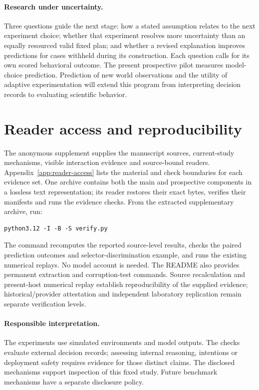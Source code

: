 \paragraph{Research under uncertainty.}
Three questions guide the next stage: how a stated assumption relates to the
next experiment choice; whether that experiment resolves more uncertainty
than an equally resourced valid fixed plan; and whether a revised explanation
improves predictions for cases withheld during its construction. Each question
calls for its own scored behavioral outcome. The present prospective pilot
measures model-choice prediction. Prediction of new world observations and
the utility of adaptive experimentation will extend this program from
interpreting decision records to evaluating scientific behavior.

\section{Reader access and reproducibility}
\label{sec:reader-access}
The anonymous supplement supplies the manuscript sources, current-study
mechanisms, visible interaction evidence and source-bound readers.
Appendix~\ref{app:reader-access} lists the material and check boundaries for
each evidence set. One archive contains both the main and prospective
components in a lossless text representation; its reader restores their
exact bytes, verifies their manifests and runs the evidence checks.
From the extracted supplementary archive, run:
\begin{verbatim}
python3.12 -I -B -S verify.py
\end{verbatim}
The command recomputes the reported source-level results, checks the paired
prediction outcomes and selector-discrimination example, and runs the
existing numerical replays. No model account is needed. The README also
provides permanent extraction and corruption-test commands. Source
recalculation and present-host numerical replay establish reproducibility
of the supplied evidence; historical/provider attestation and independent
laboratory replication remain separate verification levels.

\paragraph{Responsible interpretation.}
The experiments use simulated environments and model outputs. The checks
evaluate external decision records; assessing internal reasoning, intentions
or deployment safety requires evidence for those distinct claims. The
disclosed mechanisms support inspection of this fixed study. Future
benchmark mechanisms have a separate disclosure policy.
